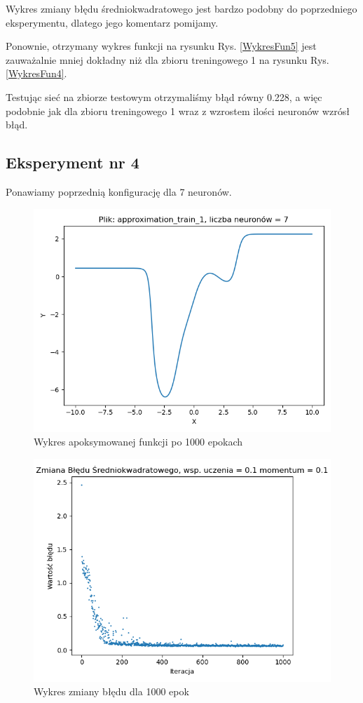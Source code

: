 \documentclass[12pt]{article}
\begin{document}
\newpage
Wykres zmiany błędu średniokwadratowego jest bardzo podobny do poprzedniego eksperymentu, dlatego jego komentarz pomijamy.

Ponownie, otrzymany wykres funkcji na rysunku Rys. \ref{WykresFun5} jest zauważalnie mniej dokładny niż dla zbioru treningowego 1 na rysunku Rys. \ref{WykresFun4}.

Testując sieć na zbiorze testowym otrzymaliśmy błąd równy 0.228, a więc podobnie jak dla zbioru treningowego 1 wraz z wzrostem ilości neuronów wzrósł błąd.
\newpage

\subsection{Eksperyment nr 4}
Ponawiamy poprzednią konfigurację dla 7 neuronów.

\begin{figure}[!htb]
 \centering
 \includegraphics[width=12cm]{FunctionPlot7Neuron.png}
 \caption{Wykres apoksymowanej funkcji po 1000 epokach}
 \vspace{-0.3cm}
 \label{WykresFun6}
\end{figure}



\begin{figure}[!htb]
 \centering
 \includegraphics[width=12cm]{ZmianaBledu7Neuron.png}
 \vspace{-0.3cm}
 \caption{Wykres zmiany błędu dla 1000 epok}
 \label{WykresBlad6}
\end{figure}
\end{document}
